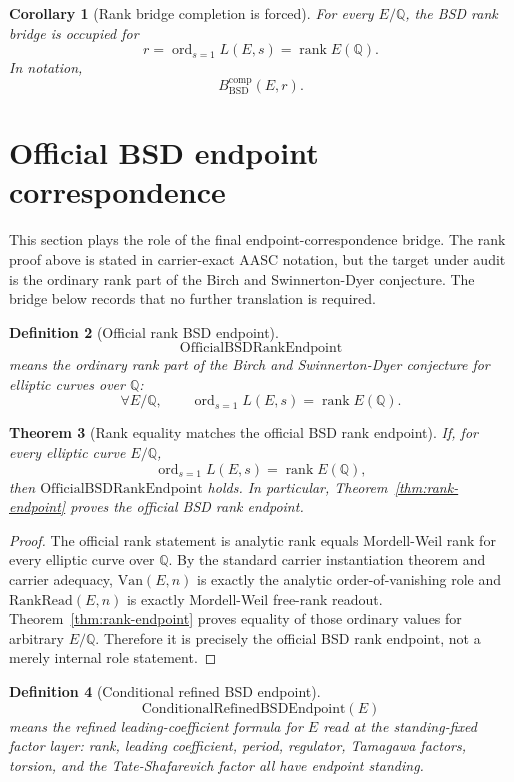 \documentclass[11pt]{article}
\newtheorem{theorem}{Theorem}[section]
\newtheorem{corollary}[theorem]{Corollary}
\newtheorem{definition}[theorem]{Definition}
\newcommand{\Q}{\mathbb{Q}}
\newcommand{\rank}{\operatorname{rank}}
\newcommand{\ord}{\operatorname{ord}}
\newcommand{\BSD}{\mathrm{BSD}}
\newcommand{\Van}{\mathrm{Van}}
\newcommand{\RankRead}{\mathrm{RankRead}}
\newcommand{\OfficialRankEndpoint}{\mathrm{OfficialBSDRankEndpoint}}
\newcommand{\CondRefinedEndpoint}{\mathrm{ConditionalRefinedBSDEndpoint}}
\newcommand{\comp}{\mathrm{comp}}
\begin{document}
\begin{corollary}[Rank bridge completion is forced]
For every $E/\Q$, the BSD rank bridge is occupied for
\[
r=\ord_{s=1}L(E,s)=\rank E(\Q).
\]
In notation,
\[
B^{\comp}_{\BSD}(E,r).
\]
\end{corollary}


\section{Official BSD endpoint correspondence}

This section plays the role of the final endpoint-correspondence bridge. The rank proof above is stated in carrier-exact AASC notation, but the target under audit is the ordinary rank part of the Birch and Swinnerton-Dyer conjecture. The bridge below records that no further translation is required.

\begin{definition}[Official rank BSD endpoint]
\[
\OfficialRankEndpoint
\]
means the ordinary rank part of the Birch and Swinnerton-Dyer conjecture for elliptic curves over $\Q$:
\[
\forall E/\Q,\qquad \ord_{s=1}L(E,s)=\rank E(\Q).
\]
\end{definition}

\begin{theorem}[Rank equality matches the official BSD rank endpoint]\label{thm:official-rank-correspondence}
If, for every elliptic curve $E/\Q$,
\[
\ord_{s=1}L(E,s)=\rank E(\Q),
\]
then $\OfficialRankEndpoint$ holds. In particular, Theorem~\ref{thm:rank-endpoint} proves the official BSD rank endpoint.
\end{theorem}

\begin{proof}
The official rank statement is analytic rank equals Mordell-Weil rank for every elliptic curve over $\Q$. By the standard carrier instantiation theorem and carrier adequacy, $\Van(E,n)$ is exactly the analytic order-of-vanishing role and $\RankRead(E,n)$ is exactly Mordell-Weil free-rank readout. Theorem~\ref{thm:rank-endpoint} proves equality of those ordinary values for arbitrary $E/\Q$. Therefore it is precisely the official BSD rank endpoint, not a merely internal role statement.
\end{proof}

\begin{definition}[Conditional refined BSD endpoint]
\[
\CondRefinedEndpoint(E)
\]
means the refined leading-coefficient formula for $E$ read at the standing-fixed factor layer: rank, leading coefficient, period, regulator, Tamagawa factors, torsion, and the Tate-Shafarevich factor all have endpoint standing.
\end{definition}
\end{document}
